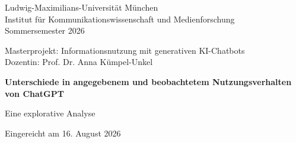 \begin{titlepage}
\thispagestyle{empty}
\singlespacing




\begin{flushleft}
\small
Ludwig-Maximilians-Universität München\\
Institut für Kommunikationswissenschaft und Medienforschung\\
Sommersemester 2026
\end{flushleft}


\vspace{2.25cm}

\begin{center}
\small
Masterprojekt: Informationsnutzung mit generativen KI-Chatbots\\
Dozentin: Prof. Dr. Anna Kümpel-Unkel
\end{center}


\vspace{1.25cm}

\begin{center}
{\LARGE\bfseries
Unterschiede in angegebenem und beobachtetem Nutzungsverhalten von ChatGPT
}

\vspace{0.6cm}

{\large Eine explorative Analyse}
\end{center}


\vspace{1.25cm}

\begin{center}
Eingereicht am 16. August 2026
\end{center}


\end{titlepage}
